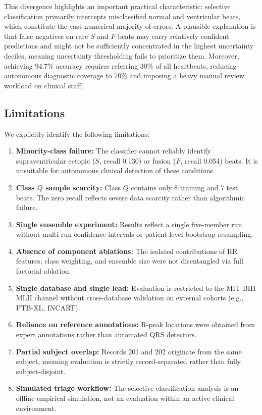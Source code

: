 \documentclass[conference]{IEEEtran}
\begin{document}
This divergence highlights an important practical characteristic: selective classification primarily intercepts misclassified normal and ventricular beats, which constitute the vast numerical majority of errors. A plausible explanation is that false negatives on rare $S$ and $F$ beats may carry relatively confident predictions and might not be sufficiently concentrated in the highest uncertainty deciles, meaning uncertainty thresholding fails to prioritize them. Moreover, achieving 94.7\% accuracy requires referring 30\% of all heartbeats, reducing autonomous diagnostic coverage to 70\% and imposing a heavy manual review workload on clinical staff.

\subsection{Limitations}
We explicitly identify the following limitations:
\begin{enumerate}
    \item \textbf{Minority-class failure:} The classifier cannot reliably identify supraventricular ectopic ($S$, recall 0.130) or fusion ($F$, recall 0.054) beats. It is unsuitable for autonomous clinical detection of these conditions.
    \item \textbf{Class $Q$ sample scarcity:} Class $Q$ contains only 8 training and 7 test beats. The zero recall reflects severe data scarcity rather than algorithmic failure.
    \item \textbf{Single ensemble experiment:} Results reflect a single five-member run without multi-run confidence intervals or patient-level bootstrap resampling.
    \item \textbf{Absence of component ablations:} The isolated contributions of RR features, class weighting, and ensemble size were not disentangled via full factorial ablation.
    \item \textbf{Single database and single lead:} Evaluation is restricted to the MIT-BIH MLII channel without cross-database validation on external cohorts (e.g., PTB-XL, INCART).
    \item \textbf{Reliance on reference annotations:} R-peak locations were obtained from expert annotations rather than automated QRS detectors.
    \item \textbf{Partial subject overlap:} Records 201 and 202 originate from the same subject, meaning evaluation is strictly record-separated rather than fully subject-disjoint.
    \item \textbf{Simulated triage workflow:} The selective classification analysis is an offline empirical simulation, not an evaluation within an active clinical environment.
\end{enumerate}
\end{document}
